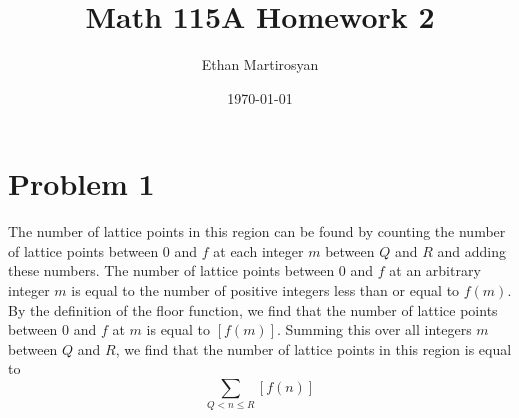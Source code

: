 \documentclass[12pt]{article}
\begin{document}
 
\title{Math 115A Homework 2}
\author{Ethan Martirosyan}
\date{\today}
\maketitle
{}
\hfuzz=50pt
\section*{Problem 1}
The number of lattice points in this region can be found by counting the number of lattice points between $0$ and $f$ at each integer $m$ between $Q$ and $R$ and adding these numbers. The number of lattice points between $0$ and $f$ at an arbitrary integer $m$ is equal to the number of positive integers less than or equal to $f(m)$. By the definition of the floor function, we find that the number of lattice points between $0$ and $f$ at $m$ is equal to $[f(m)]$. Summing this over all integers $m$ between $Q$ and $R$, we find that the number of lattice points in this region is equal to
\[
\sum_{Q < n \leq R} [f(n)]
\]
\newpage
\end{document}
